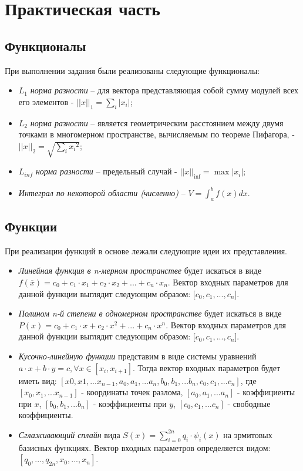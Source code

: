\chapter{Практическая часть}

\section{Функционалы}
При выполнении задания были реализованы следующие функционалы:
\begin{itemize}
	\item $L_1$ \textsl{норма разности} -- для вектора представляющая собой сумму модулей всех его элементов - ${||x||}_1 = \sum_{i}{|x_i|}$;
	\item $L_2$ \textsl{норма разности} -- является геометрическим расстоянием между двумя точками в многомерном пространстве, вычисляемым по теореме Пифагора, - ${||x||}_2 = \sqrt{\sum_{i}{{x_i}^2}}$;
	\item $L_{inf}$ \textsl{норма разности} -- предельный случай - ${||x||}_{\inf} = \max{|x_i|}$;
	\item \textsl{Интеграл по некоторой области (численно)} -- $V = \int_a^b f(x)dx$.
\end{itemize}

\section{Функции}

При реализации функций в основе лежали следующие идеи их представления.

\begin{itemize}
		\item \textsl{Линейная функция в n-мерном пространстве} будет искаться в виде $f(\overline{x}) = c_0 + c_1 \cdot x_1 + c_2 \cdot x_2 + ... + c_n \cdot x_n$. Вектор входных параметров для данной функции выглядит следующим образом: [$c_0, c_1, ..., c_n$].
		\item \textsl{Полином n-й степени в одномерном пространстве} будет искаться в виде $P(x) = c_0 + c_1 \cdot x + c_2 \cdot x^2 + ... + c_n \cdot x^n$. Вектор входных параметров для данной функции выглядит следующим образом: [$c_0, c_1, ..., c_n$].
		\item \textsl{Кусочно-линейную функции} представим в виде системы уравнений $a \cdot x + b \cdot y = c, \forall x \in [x_i, x_{i + 1}]$. Тогда вектор входных параметров будет иметь вид: $[x0, x1, ... x_{n - 1}, a_0, a_1, ... a_n, b_0, b_1, ... b_n, c_0, c_1, ... c_n]$, где $[x_0, x_1, ... x_{n-1}]$ - координаты точек разлома, $[a_0, a_1, ... a_n]$ - коэффициенты при $x$, $[b_0, b_1, ... b_n]$ - коэффициенты при $y$, $[c_0, c_1, ... c_n]$ - свободные коэффициенты.
		\item \textsl{Сглаживающий сплайн} вида $S(x) = \sum_{i = 0}^{2n} q_i \cdot \psi_i(x)$ на эрмитовых базисных функциях. Вектор входных параметров определяется видом: $[q_0, ..., q_{2n}, x_0, ..., x_n]$.
	\end{itemize}
